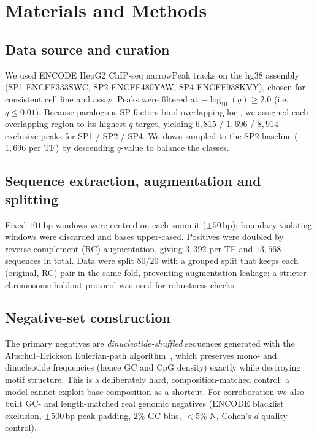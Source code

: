 \documentclass[11pt]{article}
\begin{document}
\section{Materials and Methods}

\subsection{Data source and curation}
We used ENCODE HepG2 ChIP-seq narrowPeak tracks on the hg38 assembly (SP1
ENCFF333SWC, SP2 ENCFF480YAW, SP4 ENCFF938KVY), chosen for consistent cell line and
assay. Peaks were filtered at $-\log_{10}(q)\ge 2.0$ (i.e.\ $q\le 0.01$). Because
paralogous SP factors bind overlapping loci, we assigned each overlapping region to
its highest-$q$ target, yielding $6{,}815$ / $1{,}696$ / $8{,}914$ exclusive peaks for
SP1 / SP2 / SP4. We down-sampled to the SP2 baseline ($1{,}696$ per TF) by descending
$q$-value to balance the classes.

\subsection{Sequence extraction, augmentation and splitting}
Fixed $101$\,bp windows were centred on each summit ($\pm 50$\,bp); boundary-violating
windows were discarded and bases upper-cased. Positives were doubled by
reverse-complement (RC) augmentation, giving $3{,}392$ per TF and $13{,}568$ sequences
in total. Data were split $80/20$ with a grouped split that keeps each
(original, RC) pair in the same fold, preventing augmentation leakage; a stricter
chromosome-holdout protocol was used for robustness checks.

\subsection{Negative-set construction}
The primary negatives are \emph{dinucleotide-shuffled} sequences generated with the
Altschul--Erickson Eulerian-path algorithm~\cite{altschul}, which preserves mono-
and dinucleotide frequencies (hence GC and CpG density) exactly while destroying
motif structure. This is a deliberately hard, composition-matched control: a model
cannot exploit base composition as a shortcut. For corroboration we also built
GC- and length-matched real genomic negatives (ENCODE blacklist exclusion,
$\pm 500$\,bp peak padding, $2\%$ GC bins, $<\!5\%$ N, Cohen's-$d$ quality control).
\end{document}
